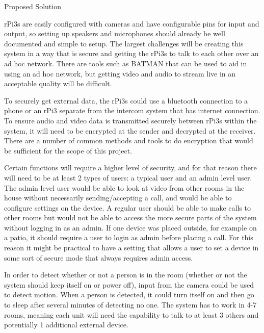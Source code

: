 \documentclass{article}
\begin{document}
\vspace{1cm}
Proposed Solution
\vspace{1cm}

rPi3s are easily configured with cameras and have configurable pins for input and output, so setting up speakers and microphones should already be well documented and simple to setup. The largest challenges will be creating this system in a way that is secure and getting the rPi3s to talk to each other over an ad hoc network. There are tools such as BATMAN that can be used to aid in using an ad hoc network, but getting video and audio to stream live in an acceptable quality will be difficult. 

To securely get external data, the rPi3s could use a bluetooth connection to a phone or an rPi3 separate from the intercom system that has internet connection. To ensure audio and video data is transmitted securely between rPi3s within the system, it will need to be encrypted at the sender and decrypted at the receiver. There are a number of common methods and tools to do encryption that would be sufficient for the scope of this project. 

Certain functions will require a higher level of security, and for that reason there will need to be at least 2 types of users: a typical user and an admin level user. The admin level user would be able to look at video from other rooms in the house without necessarily sending/accepting a call, and would be able to configure settings on the device. A regular user should be able to make calls to other rooms but would not be able to access the more secure parts of the system without logging in as an admin. If one device was placed outside, for example on a patio, it should require a user to login as admin before placing a call. For this reason it might be practical to have a setting that allows a user to set a device in some sort of secure mode that always requires admin access. 

In order to detect whether or not a person is in the room (whether or not the system should keep itself on or power off), input from the camera could be used to detect motion. When a person is detected, it could turn itself on and then go to sleep after several minutes of detecting no one. The system has to work in 4-7 rooms, meaning each unit will need the capability to talk to at least 3 others and potentially 1 additional external device.  
\end{document}
